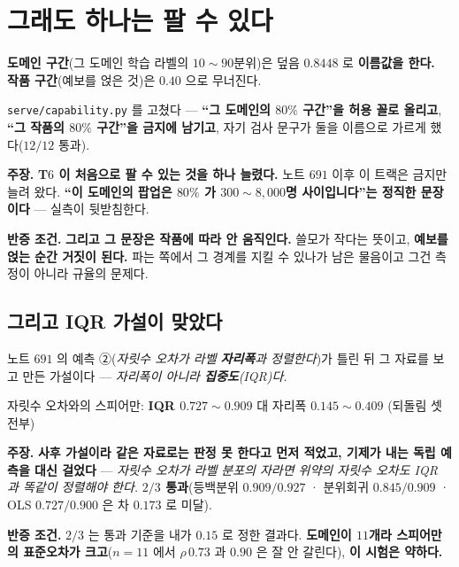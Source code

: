 \documentclass[10pt,a4paper]{article}
\newcommand{\claim}[2]{\begin{claimbox}\textbf{주장.} #1\par\smallskip
  \textcolor{gray!70}{\textbf{반증 조건.} #2}\end{claimbox}}
\begin{document}
\section{그래도 하나는 팔 수 있다}

\begin{center}
\textbf{도메인 구간}(그 도메인 학습 라벨의 $10{\sim}90$분위)은 덮음
$\mathbf{0.8448}$ 로 \textbf{이름값을 한다.}\\
\textbf{작품 구간}(예보를 얹은 것)은 $\mathbf{0.40}$ 으로 무너진다.
\end{center}

\texttt{serve/capability.py} 를 고쳤다 --- \textbf{``그 도메인의 $80\%$ 구간''을
허용 꼴로 올리고}, \textbf{``그 작품의 $80\%$ 구간''을 금지에 남기고},
자기 검사 문구가 둘을 이름으로 가르게 했다($12/12$ 통과).

\claim{\textbf{T$6$ 이 처음으로 팔 수 있는 것을 하나 늘렸다.} 노트 $691$ 이후
이 트랙은 금지만 늘려 왔다. \textbf{``이 도메인의 팝업은 $80\%$ 가 $300{\sim}8{,}000$명
사이입니다''는 정직한 문장이다} --- 실측이 뒷받침한다.}
{\textbf{그리고 그 문장은 작품에 따라 안 움직인다.} 쓸모가 작다는 뜻이고,
\textbf{예보를 얹는 순간 거짓이 된다.} 파는 쪽에서 그 경계를 지킬 수 있나가
남은 물음이고 그건 측정이 아니라 규율의 문제다.}

\subsection*{그리고 IQR 가설이 맞았다}

노트 $691$ 의 예측 ②(\emph{자릿수 오차가 라벨 \textbf{자리폭}과 정렬한다})가 틀린 뒤
그 자료를 보고 만든 가설이다 --- \emph{자리폭이 아니라 \textbf{집중도}(IQR)다.}

\begin{center}
자릿수 오차와의 스피어만: \textbf{IQR $0.727 \sim 0.909$} 대 자리폭 $0.145 \sim 0.409$
(되돌림 셋 전부)
\end{center}

\claim{\textbf{사후 가설이라 같은 자료로는 판정 못 한다고 먼저 적었고, 기제가 내는
독립 예측을 대신 걸었다} --- \emph{자릿수 오차가 라벨 분포의 자라면 위약의 자릿수
오차도 IQR 과 똑같이 정렬해야 한다.} \textbf{$2/3$ 통과}(등백분위 $0.909/0.927$ ·
분위회귀 $0.845/0.909$ · OLS $0.727/0.900$ 은 차 $0.173$ 로 미달).}
{$2/3$ 는 통과 기준을 내가 $0.15$ 로 정한 결과다. \textbf{도메인이 $11$개라
스피어만의 표준오차가 크고}($n{=}11$ 에서 $\rho\,0.73$ 과 $0.90$ 은 잘 안 갈린다),
\textbf{이 시험은 약하다.}}
\end{document}
